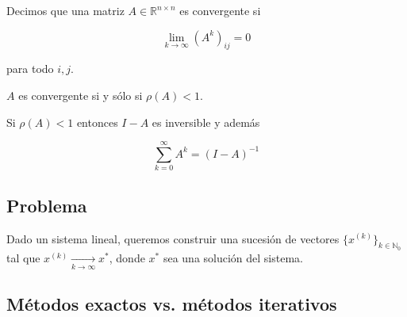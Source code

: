 \begin{defi}
Decimos que una matriz $A \in \mathbb{R}^{n \times n}$ es convergente si

\[\lim_{k \to \infty}(A^k)_{ij} = 0\]

para todo $i, j$.
\end{defi}

\begin{propo}
$A$ es convergente si y sólo si $\rho(A) < 1$.
\end{propo}

\begin{propo}
Si $\rho(A) < 1$ entonces $I - A$ es inversible y además

\[\sum_{k = 0}^{\infty}A^k = (I - A)^{-1}\]
\end{propo}

\subsection{Problema}

Dado un sistema lineal, queremos construir una sucesión de vectores $\{x^{(k)}\}_{k \in \mathbb{N}_0}$ tal que $x^{(k)} \xrightarrow[k \to \infty]{} x^{*}$, donde $x^{*}$ sea una solución del sistema.

\subsection{Métodos exactos vs. métodos iterativos}

